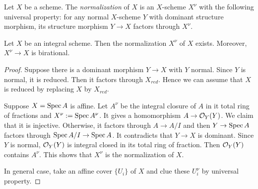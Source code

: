     \begin{example}
        
    \end{example}

    \begin{definition}
        Let $X$ be a scheme.
        The \textit{normalization} of $X$ is an $X$-scheme $X^\nu$ with the following universal property:
        for any normal $X$-scheme $Y$ with dominant structure morphism, its structure morphism $Y \to X$ factors through $X^\nu$.
    \end{definition}

    \begin{proposition}
        Let $X$ be an integral scheme.
        Then the normalization $X^\nu$ of $X$ exists.
        Moreover, $X^\nu \to X$ is birational.
    \end{proposition}
    \begin{proof}
        Suppose there is a dominant morphism $Y \to X$ with $Y$ normal.
        Since $Y$ is normal, it is reduced.
        Then it factors through $X_{red}$.
        Hence we can assume that $X$ is reduced by replacing $X$ by $X_{red}$.

        Suppose $X = \operatorname{Spec} A$ is affine.
        Let $A^\nu$ be the integral closure of $A$ in it total ring of fractions and $X^\nu := \operatorname{Spec} A^\nu$.
        It gives a homomorphism $A \to {\mathcal{O}}_Y(Y)$.
        We claim that it is injective.
        Otherwise, it factors through $A \to A/I$ and then $Y \to \operatorname{Spec} A$ factors through $\operatorname{Spec} A/I \to \operatorname{Spec} A$.
        It contradicts that $Y \to X$ is dominant.
        Since $Y$ is normal, ${\mathcal{O}}_Y(Y)$ is integral closed in its total ring of fraction.
        Then ${\mathcal{O}}_Y(Y)$ contains $A^\nu$.
        This shows that $X^\nu$ is the normalization of $X$.

        In general case, take an affine cover $\{U_i\}$ of $X$ and clue these $U_i^\nu$ by universal property.
    \end{proof}


